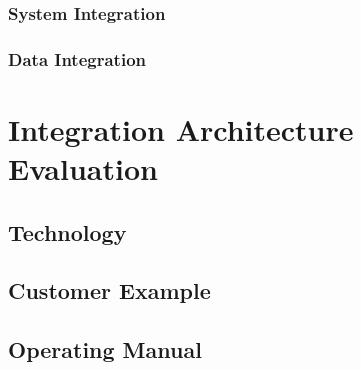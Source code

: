 \documentclass[
     12pt,         %
     a4paper,      %
     BCOR10mm,     %
     DIV14,        %
aragraph skip instad of paragraph indent
     ]{scrreprt}
\begin{document}
\subsection{System Integration}

\subsection{Data Integration}


\chapter{Integration Architecture Evaluation}

\section{Technology}

\section{Customer Example}

\section{Operating Manual}



\end{document}
